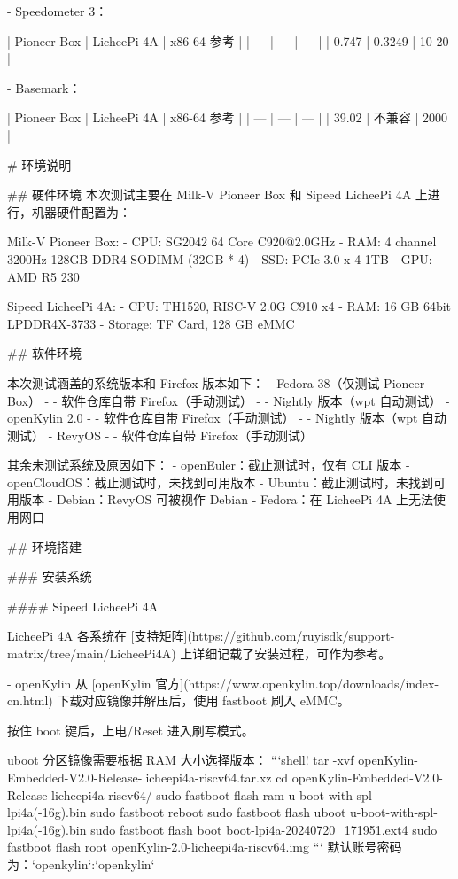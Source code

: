 \documentclass{article}
\begin{document}
\begin{markdown}
- Speedometer 3：

| Pioneer Box | LicheePi 4A | x86-64 参考 |
| --- | --- | --- |
| 0.747 | 0.3249 | 10-20 |

- Basemark：

| Pioneer Box | LicheePi 4A | x86-64 参考 |
| --- | --- | --- |
| 39.02 | 不兼容 | 2000 |

# 环境说明

## 硬件环境
本次测试主要在 Milk-V Pioneer Box 和 Sipeed LicheePi 4A 上进行，机器硬件配置为：

Milk-V Pioneer Box:
- CPU: SG2042 64 Core C920@2.0GHz
- RAM: 4 channel 3200Hz 128GB DDR4 SODIMM (32GB * 4)
- SSD: PCIe 3.0 x 4 1TB
- GPU: AMD R5 230

Sipeed LicheePi 4A:
- CPU: TH1520, RISC-V 2.0G C910 x4
- RAM: 16 GB 64bit LPDDR4X-3733
- Storage: TF Card, 128 GB eMMC

## 软件环境

本次测试涵盖的系统版本和 Firefox 版本如下：
- Fedora 38（仅测试 Pioneer Box）
- - 软件仓库自带 Firefox（手动测试）
- - Nightly 版本（wpt 自动测试）
- openKylin 2.0
- - 软件仓库自带 Firefox（手动测试）
- - Nightly 版本（wpt 自动测试）
- RevyOS
- - 软件仓库自带 Firefox（手动测试）

其余未测试系统及原因如下：
- openEuler：截止测试时，仅有 CLI 版本
- openCloudOS：截止测试时，未找到可用版本
- Ubuntu：截止测试时，未找到可用版本
- Debian：RevyOS 可被视作 Debian
- Fedora：在 LicheePi 4A 上无法使用网口

## 环境搭建


### 安装系统

#### Sipeed LicheePi 4A

LicheePi 4A 各系统在 [支持矩阵](https://github.com/ruyisdk/support-matrix/tree/main/LicheePi4A) 上详细记载了安装过程，可作为参考。

- openKylin
从 [openKylin 官方](https://www.openkylin.top/downloads/index-cn.html) 下载对应镜像并解压后，使用 fastboot 刷入 eMMC。

按住 boot 键后，上电/Reset 进入刷写模式。

uboot 分区镜像需要根据 RAM 大小选择版本：
```shell!
tar -xvf openKylin-Embedded-V2.0-Release-licheepi4a-riscv64.tar.xz
cd openKylin-Embedded-V2.0-Release-licheepi4a-riscv64/
sudo fastboot flash ram u-boot-with-spl-lpi4a(-16g).bin
sudo fastboot reboot
sudo fastboot flash uboot u-boot-with-spl-lpi4a(-16g).bin
sudo fastboot flash boot boot-lpi4a-20240720_171951.ext4
sudo fastboot flash root openKylin-2.0-licheepi4a-riscv64.img
```
默认账号密码为：`openkylin`:`openkylin`


\end{markdown}
\end{document}
